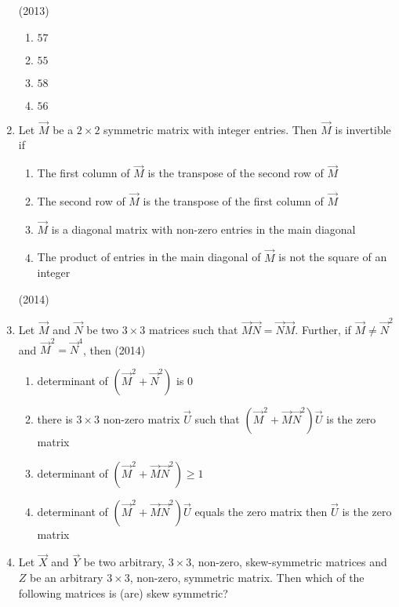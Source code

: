 \begin{enumerate}
        \hfill (2013)
\begin{multicols}{4}
        \begin{enumerate}
            \item $57$
            \item $55$
            \item $58$
            \item $56$
        \end{enumerate}
\end{multicols}
    \item 
        Let $\vec{M}$ be a $2 \times 2$ symmetric matrix with integer entries. Then $\vec{M}$ is invertible if
            \begin{enumerate}
                \item The first column of $\vec{M}$ is the transpose of the second row of $\vec{M}$
                \item The second row of $\vec{M}$ is the transpose of the first column of $\vec{M}$
                \item $\vec{M}$ is a diagonal matrix with non-zero entries in the main diagonal
                \item The product of entries in the main diagonal of $\vec{M}$ is not the square of an integer
            \end{enumerate}
            \hfill (2014)
    \item
        Let $\vec{M}$ and $\vec{N}$ be two $3 \times 3$ matrices such that $\vec{M}\vec{N}=\vec{N}\vec{M}$. Further, if $\vec{M} \neq \vec{N}^2$ and $\vec{M}^2 = \vec{N}^4$, then
            \hfill (2014)
            \begin{enumerate}
                \item determinant of $(\vec{M}^2 + \vec{N}^2)$ is $0$
                \item there is $3 \times 3$ non-zero matrix $\vec{U}$ such that $(\vec{M}^2+\vec{M}\vec{N}^2)\vec{U}$ is the zero matrix
                \item determinant of $(\vec{M}^2 + \vec{M}\vec{N}^2) \geq 1$
                \item determinant of $(\vec{M}^2 + \vec{M}\vec{N}^2)\vec{U}$ equals the zero matrix then $\vec{U}$ is the zero matrix
            \end{enumerate}
    \item
        Let $\vec{X}$ and $\vec{Y}$ be two arbitrary, $3 \times 3$, non-zero, skew-symmetric matrices and $Z$ be an arbitrary $3 \times 3$, non-zero, symmetric matrix. Then which of the following matrices is (are) skew symmetric?

\end{enumerate}
